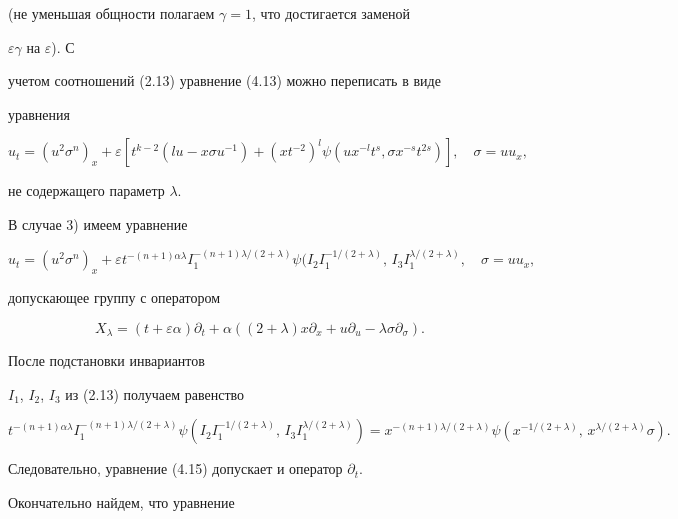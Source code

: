(не уменьшая общности полагаем $\gamma=1$, что достигается заменой


$\varepsilon\gamma$ на $\varepsilon$). С


учетом соотношений (2.13) уравнение (4.13) можно переписать в виде


уравнения


$$


u_t=(u^2\sigma^n)_x+\varepsilon[t^{k-2}(lu-x\sigma u^{-1})


+(xt^{-2})^l\psi(ux^{-l}t^s,\sigma x^{-s}t^{2s})],\quad


\sigma=uu_x,


$$


не содержащего параметр $\lambda$.





В случае 3) имеем уравнение


\begin{equation}


u_t=(u^2\sigma^n)_x+\varepsilon t^{-(n+1)\alpha\lambda}


I_1^{-(n+1)\lambda/(2+\lambda)}


\psi(I_2I_1^{-1/(2+\lambda)},\,I_3I_1^{\lambda/(2+\lambda)},\quad


\sigma=uu_x,\tag{4.15}


\end{equation}


допускающее группу с оператором


$$


X_\lambda=(t+\varepsilon\alpha)\partial_t+\alpha


((2+\lambda)x\partial_x+u\partial_u-\lambda\sigma\partial_\sigma).


$$


После подстановки инвариантов


$I_1$, $I_2$, $I_3$ из (2.13) получаем равенство


$$


t^{-(n+1)\alpha\lambda}I_1^{-(n+1)\lambda/(2+\lambda)}


\psi(I_2I_1^{-1/(2+\lambda)},\,I_3I_1^{\lambda/(2+\lambda)})=


x^{-(n+1)\lambda/(2+\lambda)}\psi


(x^{-1/(2+\lambda)},\,x^{\lambda/(2+\lambda)}\sigma).


$$


Следовательно, уравнение (4.15) допускает и оператор $\partial_t$.


Окончательно найдем, что уравнение


